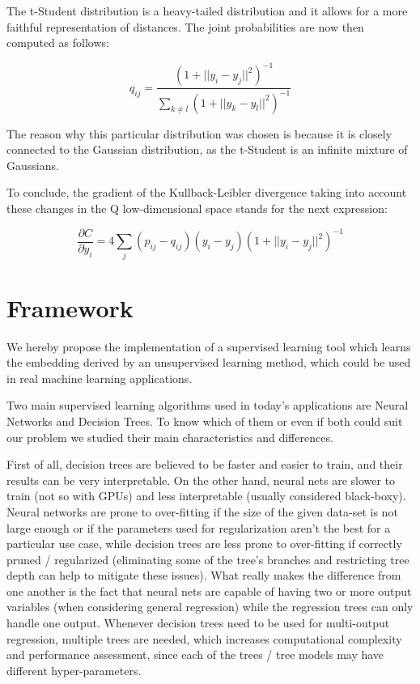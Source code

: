 \documentclass[a4paper,11pt,spanish]{report}
\begin{document}
The t-Student distribution is a heavy-tailed distribution and it allows for a more faithful representation of distances. The joint probabilities are now then computed as follows:

$$ q_{ij} = \frac{(1+ ||y_{i}-y_{j}||^2)^{-1}} {\sum\limits_{k\neq l} (1+ ||y_{k}-y_{l}||^2)^{-1} }$$

The reason why this particular distribution was chosen is because it is closely connected to the Gaussian distribution, as the t-Student is an infinite mixture of Gaussians.

To conclude, the gradient of the Kullback-Leibler divergence taking into account these changes in the Q low-dimensional space stands for the next expression:

$$ \frac{\partial C}{\partial y_{i}} = 4 \sum\limits_j (p_{ij} - q_{ij}) (y_{i} - y_{j}) (1+ ||y_{i}-y_{j}||^2)^{-1}$$



\chapter{Framework}
\label{chap:frame}

We hereby propose the implementation of a supervised learning tool which learns the embedding derived by an unsupervised learning method, which could be used in real machine learning applications.

Two main supervised learning algorithms used in today's applications are Neural Networks and Decision Trees. To know which of them or even if both could suit our problem we studied their main characteristics and differences.

First of all, decision trees are believed to be faster and easier to train, and their results can be very interpretable. On the other hand, neural nets are slower to train (not so with GPUs) and less interpretable (usually considered black-boxy). Neural networks are prone to over-fitting if the size of the given data-set is not large enough or if the parameters used for regularization aren't the best for a particular use case, while decision trees are less prone to over-fitting if correctly pruned / regularized (eliminating some of the tree's branches and restricting tree depth can help to mitigate these issues). What really makes the difference from one another is the fact that neural nets are capable of having two or more output variables (when considering general regression) while the regression trees can only handle one output. Whenever decision trees need to be used for multi-output regression, multiple trees are needed, which increases computational complexity and performance assessment, since each of the trees / tree models may have different hyper-parameters.
\end{document}
